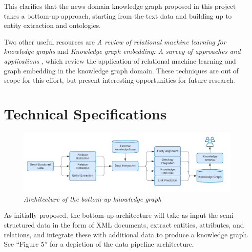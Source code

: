 \documentclass[11pt]{article}
\begin{document}
  This clarifies that the news domain knowledge graph proposed in this project takes a bottom-up approach, starting from the text data and building up to entity extraction and ontologies.

  Two other useful resources are \textit{A review of relational machine learning for knowledge graphs} \cite{nickel2015review} and \textit{Knowledge graph embedding: A survey of approaches and applications} \cite{wang2017knowledge}, which review the application of relational machine learning and graph embedding in the knowledge graph domain. These techniques are out of scope for this effort, but present interesting opportunities for future research.

\section{Technical Specifications}

  \begin{figure}
  \centerline{\includegraphics[scale=0.275]{bottom-up-kg-architecture}}
  \caption{\textit{Architecture of the bottom-up knowledge graph}}
  \label{figure:BottomUpKGArchitecture}
  \end{figure}

  As initially proposed\cite{ek-proposal}, the bottom-up architecture will take as input the semi-structured data in the form of XML documents, extract entities, attributes, and relations, and integrate these with additional data to produce a knowledge graph. See ``Figure 5'' for a depiction of the data pipeline architecture.
\end{document}
